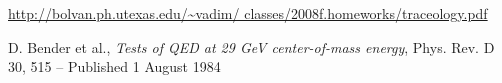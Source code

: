 \documentclass[10pt,a4paper]{article}
\begin{document}
\begin{thebibliography}{2}

\url{http://bolvan.ph.utexas.edu/~vadim/	classes/2008f.homeworks/traceology.pdf}

	D. Bender et al., \textit{Tests of QED at 29 GeV center-of-mass energy}, Phys. Rev. D 30, 515 – Published 1 August 1984
	
\end{thebibliography}
 
\end{document}
